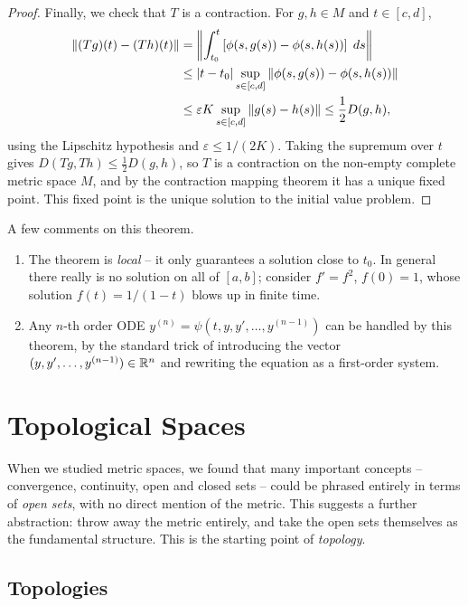 \documentclass[a4paper]{scrartcl}
\begin{document}
\begin{proof}
    Finally, we check that $T$ is a contraction. For $g, h \in M$ and $t \in [c, d]$,
    \begin{align*}
    \norm{(Tg)(t) - (Th)(t)} &= \norm{\int_{t_0}^t \left[\phi(s, g(s)) - \phi(s, h(s))\right] \; d s} \\
    &\leq |t - t_0| \sup_{s \in [c, d]} \norm{\phi(s, g(s)) - \phi(s, h(s))} \\
    &\leq \varepsilon K \sup_{s \in [c, d]} \norm{g(s) - h(s)} \leq \frac{1}{2} D(g, h),
    \end{align*}
    using the Lipschitz hypothesis and $\varepsilon \leq 1/(2K)$. Taking the supremum over $t$ gives $D(Tg, Th) \leq \frac{1}{2}D(g, h)$, so $T$ is a contraction on the non-empty complete metric space $M$, and by the contraction mapping theorem it has a unique fixed point. This fixed point is the unique solution to the initial value problem.
\end{proof}

\begin{remark}
    A few comments on this theorem.
    \begin{enumerate}[label=(\roman*)]
        \item The theorem is \emph{local} -- it only guarantees a solution close to $t_0$. In general there really is no solution on all of $[a, b]$; consider $f' = f^2$, $f(0) = 1$, whose solution $f(t) = 1/(1 - t)$ blows up in finite time.
        \item Any $n$-th order ODE $y^{(n)} = \psi(t, y, y', \dots, y^{(n-1)})$ can be handled by this theorem, by the standard trick of introducing the vector $(y, y', \dots, y^{(n - 1)}) \in \mathbb{R}^n$ and rewriting the equation as a first-order system.
    \end{enumerate}
\end{remark}

\section{Topological Spaces}

When we studied metric spaces, we found that many important concepts -- convergence, continuity, open and closed sets -- could be phrased entirely in terms of \emph{open sets}, with no direct mention of the metric. This suggests a further abstraction: throw away the metric entirely, and take the open sets themselves as the fundamental structure. This is the starting point of \emph{topology}.

\subsection{Topologies}
\end{document}
